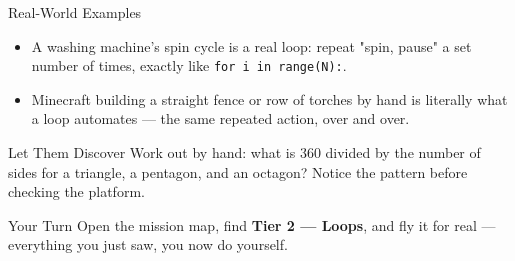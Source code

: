 \documentclass[aspectratio=169]{beamer}
\begin{document}
\begin{frame}{Real-World Examples}
    \large
    \begin{itemize}
        \item A washing machine's spin cycle is a real loop: repeat "spin, pause" a set number of times, exactly like \texttt{for i in range(N):}.
        \item Minecraft building a straight fence or row of torches by hand is literally what a loop automates --- the same repeated action, over and over.
    \end{itemize}
\end{frame}


\begin{frame}{Let Them Discover}
    \large
    Work out by hand: what is 360 divided by the number of sides for a triangle, a pentagon, and an octagon? Notice the pattern before checking the platform.
\end{frame}

\begin{frame}{Your Turn}
    \Large
    Open the mission map, find \textbf{Tier 2 — Loops}, and fly it for real ---
    everything you just saw, you now do yourself.
\end{frame}
\end{document}
